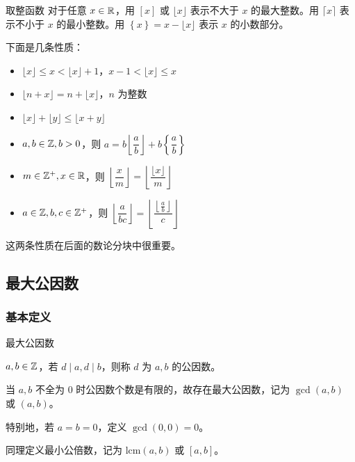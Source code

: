 \documentclass[../main.tex]{subfiles}
\begin{document}
\begin{frame}{取整函数}
对于任意 $x\in \mathbb{R}$，用 $\left[x\right]$ 或 $\lfloor x \rfloor$ 表示不大于 $x$ 的最大整数。用 $\lceil x\rceil$ 表示不小于 $x$ 的最小整数。用 $\left\{x\right\}=x-\lfloor x\rfloor$ 表示 $x$ 的小数部分。 \pause

\bigskip
下面是几条性质：\pause

\begin{itemize}
\item $\lfloor x\rfloor\le x<\lfloor x\rfloor+1$，$x-1<\lfloor x\rfloor\le x$\pause
\item $\lfloor n+x\rfloor=n+\lfloor x\rfloor$，$n$ 为整数\pause
\item $\lfloor x\rfloor+\lfloor y\rfloor\le\lfloor x+y\rfloor$\pause
\item $a,b\in\mathbb{Z},b>0$，则 $a=b\left\lfloor\dfrac{a}{b}\right\rfloor+b\left\{\dfrac{a}{b}\right\}$
\end{itemize}
\end{frame}

\begin{frame}
\begin{theo}[复合性质]
\begin{itemize}
\item $m\in\mathbb{Z}^{+},x\in\mathbb{R}$，则 $\left\lfloor\dfrac{x}{m}\right\rfloor=\left\lfloor\dfrac{\lfloor x\rfloor}{m}\right\rfloor$
\item $a\in\mathbb{Z},b,c\in\mathbb{Z}^{+}$，则 $\left\lfloor\dfrac{a}{bc}\right\rfloor=\left\lfloor\dfrac{\left\lfloor\frac{a}{b}\right\rfloor}{c}\right\rfloor$
\end{itemize}
\end{theo}

这两条性质在后面的数论分块中很重要。
\end{frame}

\subsection{最大公因数}

\subsubsection{基本定义}

\begin{frame}{最大公因数}
\begin{defi}
$a,b\in \mathbb{Z}$，若 $d\mid a,d\mid b$，则称 $d$ 为 $a,b$ 的公因数。\pause

当 $a,b$ 不全为 $0$ 时公因数个数是有限的，故存在最大公因数，记为 $\gcd(a,b)$ 或 $(a,b)$。 \pause

特别地，若 $a=b=0$，定义 $\gcd(0,0)=0$。 \pause

同理定义最小公倍数，记为 $\mathrm{lcm}(a,b)$ 或 $\left[a,b\right]$。
\end{defi}
\end{frame}
\end{document}
